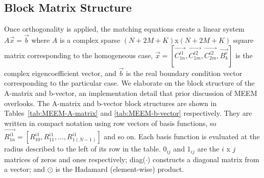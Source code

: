 \begin{appendices}
\subsection{Block Matrix Structure}

Once orthogonality is applied, the matching equations create a linear system $A\vec{x}=\vec{b}$ where $A$ is a complex sparse $(N+2M+K)$x$(N+2M+K)$ square matrix corresponding to the homogeneous case, $\vec{x}=[\vec{C_{1n}^{i1}}, \vec{C_{1m}^{i2}}, \vec{C_{2m}^{i2}}, \vec{B_{k}^{e}}]$ is the complex eigencoefficient vector, and $\vec{b}$ is the real boundary condition vector corresponding to the particular case.
We elaborate on the block structure of the A-matrix and b-vector, an implementation detail that prior discussion of MEEM overlooks.
The A-matrix and b-vector block structures are shown in Tables~\ref{tab:MEEM-A-matrix} and \ref{tab:MEEM-b-vector} respectively.
They are written in compact notation using row vectors of basis functions, so $\vec{R_{1n}^{i1}}=[R_{10}^{i1}, R_{11}^{i1}, ..., R_{1(N-1)}^{i1}]$ and so on.
Each basis function is evaluated at the radius described to the left of its row in the table. $0_{ij}$ and $1_{ij}$ are the $i$ x $j$ matrices of zeros and ones respectively; diag($\cdot$) constructs a diagonal matrix from a vector; and $\odot$ is the Hadamard (element-wise) product.


\end{appendices}
